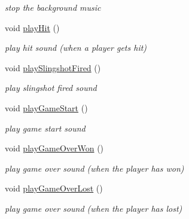 \begin{DoxyCompactItemize}
\begin{DoxyCompactList}\small\item\em stop the background music \item\end{DoxyCompactList}\item 
\hypertarget{classAudio_a5ddf491058537000fed8af79dbf2a35b}{
void \hyperlink{classAudio_a5ddf491058537000fed8af79dbf2a35b}{playHit} ()}
\label{classAudio_a5ddf491058537000fed8af79dbf2a35b}

\begin{DoxyCompactList}\small\item\em play hit sound (when a player gets hit) \item\end{DoxyCompactList}\item 
\hypertarget{classAudio_afdc5abc6b0be2303beb366901d08f183}{
void \hyperlink{classAudio_afdc5abc6b0be2303beb366901d08f183}{playSlingshotFired} ()}
\label{classAudio_afdc5abc6b0be2303beb366901d08f183}

\begin{DoxyCompactList}\small\item\em play slingshot fired sound \item\end{DoxyCompactList}\item 
\hypertarget{classAudio_ab645b7ef99ecfecaa3f2df5edd0e6d80}{
void \hyperlink{classAudio_ab645b7ef99ecfecaa3f2df5edd0e6d80}{playGameStart} ()}
\label{classAudio_ab645b7ef99ecfecaa3f2df5edd0e6d80}

\begin{DoxyCompactList}\small\item\em play game start sound \item\end{DoxyCompactList}\item 
\hypertarget{classAudio_a8d71a98c801429602b8d8ab23f494ac9}{
void \hyperlink{classAudio_a8d71a98c801429602b8d8ab23f494ac9}{playGameOverWon} ()}
\label{classAudio_a8d71a98c801429602b8d8ab23f494ac9}

\begin{DoxyCompactList}\small\item\em play game over sound (when the player has won) \item\end{DoxyCompactList}\item 
\hypertarget{classAudio_a832770af29658fc578e81d8e1651088f}{
void \hyperlink{classAudio_a832770af29658fc578e81d8e1651088f}{playGameOverLost} ()}
\label{classAudio_a832770af29658fc578e81d8e1651088f}

\begin{DoxyCompactList}\small\item\em play game over sound (when the player has lost) \item\end{DoxyCompactList}\end{DoxyCompactItemize}


